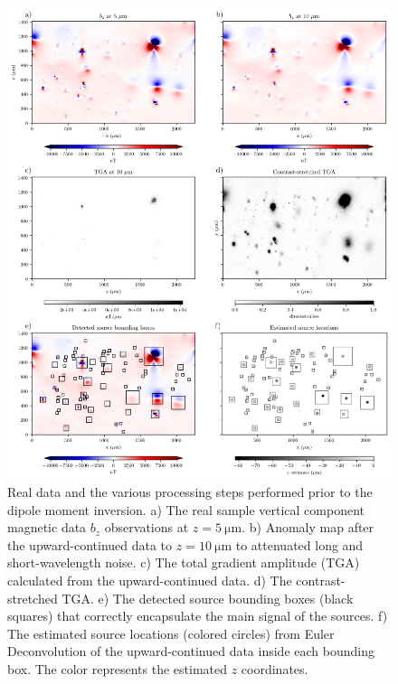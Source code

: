 \begin{figure}[ph!]
\centering
\includegraphics[width=1\linewidth]{figures/real-data.png}
\caption{Real data and the various processing steps performed prior to the dipole moment inversion.
    a) The real sample vertical component magnetic data $b_z$ observations at
    $z = \qty{5}{\um}$.
    b) Anomaly map after the upward-continued data to $z = \qty{10}{\um}$ to attenuated long and short-wavelength noise.
    c) The total gradient amplitude (TGA) calculated from the
    upward-continued data.
    d) The contrast-stretched TGA.
    e) The detected source bounding boxes (black squares) that correctly
    encapsulate the main signal of the sources.
    f) The estimated source locations (colored circles) from Euler
    Deconvolution of the upward-continued data inside each bounding box.
    The color represents the estimated $z$ coordinates.
  }
\label{real-data}
\end{figure}

